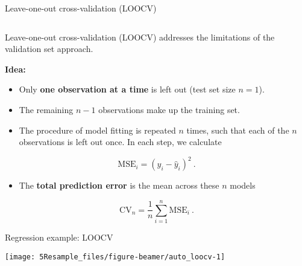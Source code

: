\documentclass[10pt,ignorenonframetext,]{beamer}
\providecommand{\tightlist}{%
  \setlength{\itemsep}{0pt}\setlength{\parskip}{0pt}}
\begin{document}
\begin{frame}

\begin{block}{Leave-one-out cross-validation (LOOCV)}

\(~\)

Leave-one-out cross-validation (LOOCV) addresses the limitations of the
validation set approach.

\vspace{4mm}

\textbf{Idea:}

\begin{itemize}
\tightlist
\item
  Only \textbf{one observation at a time} is left out (test set size
  \(n=1\)).
\item
  The remaining \(n-1\) observations make up the training set.
\item
  The procedure of model fitting is repeated \(n\) times, such that each
  of the \(n\) observations is left out once. In each step, we calculate
\end{itemize}

\[\text{MSE}_i=(y_i-\hat{y}_i)^2 \ .\]

\begin{itemize}
\tightlist
\item
  The \textbf{total prediction error} is the mean across these \(n\)
  models
\end{itemize}

\[\text{CV}_{n}=\frac{1}{n}\sum_{i=1}^n \text{MSE}_i \ .\]

\end{block}

\end{frame}

\begin{frame}

\begin{block}{Regression example: LOOCV}

\begin{center}\texttt{[image: 5Resample\_files/figure-beamer/auto\_loocv-1]} \end{center}

\tiny

\normalsize

\end{block}

\end{frame}
\end{document}
